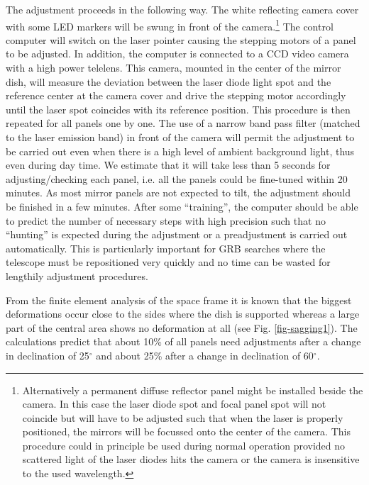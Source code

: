 The adjustment proceeds in the following way. The white reflecting camera
cover with some LED markers will be swung in front of the camera.\footnote{%
Alternatively a permanent diffuse reflector panel might be installed beside
the camera. In this case the laser diode spot and focal panel spot will not
coincide but will have to be adjusted such that when the laser is properly
positioned, the mirrors will be focussed onto the center of the camera. This
procedure could in principle be used during normal operation provided no
scattered light of the laser diodes hits the camera or the camera is
insensitive to the used wavelength.} The control computer will switch on the
laser pointer causing the stepping motors of a panel to be adjusted. In
addition, the computer is connected to a CCD video camera with a high power
telelens. This camera, mounted in the center of the mirror dish, will
measure the deviation between the laser diode light spot and the reference
center at the camera cover and drive the stepping motor accordingly until
the laser spot coincides with its reference position. This procedure is then
repeated for all panels one by one. The use of a narrow band pass filter
(matched to the laser emission band) in front of the camera will permit the
adjustment to be carried out even when there is a high level of ambient
background light, thus even during day time. We estimate that it will take
less than 5 seconds for adjusting/checking each panel, i.e. all the panels
could be fine-tuned within 20 minutes. As most mirror panels are not
expected to tilt, the adjustment should be finished in a few minutes. After
some ``training'', the computer should be able to predict the number of
necessary steps with high precision such that no ``hunting'' is expected
during the adjustment or a preadjustment is carried out automatically. This
is particularly important for GRB searches where the telescope must be
repositioned very quickly and no time can be wasted for lengthily adjustment
procedures.

From the finite element analysis of the space frame it is known that the
biggest deformations occur close to the sides where the dish is supported
whereas a large part of the central area shows no deformation at all (see
Fig. \ref{fig-sagging1}). The calculations predict that about 10\% of all panels need
adjustments after a change in declination of 25$^\circ$ and about 25\% after
a change in declination of 60$^\circ$.

